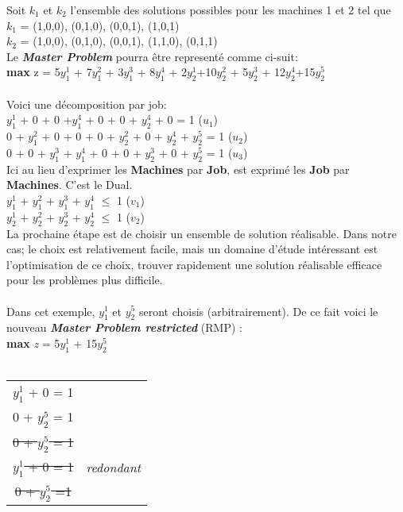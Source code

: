 \vspace{1cm}

Soit \textit{$k_1$} et \textit{$k_2$} l'ensemble des solutions possibles pour les machines 1 et 2 tel que
\\
\textit{$k_1$} = { (1,0,0), (0,1,0), (0,0,1), (1,0,1)} \\
\textit{$k_2$} = {  (1,0,0), (0,1,0), (0,0,1), (1,1,0), (0,1,1)} \\ 

Le \textbf{\textit{Master Problem}} pourra être representé comme ci-suit:
\\
\textbf{max} z = 5$y_1^1$ + 7$y_1^2$ + 3$y_1^3$ + 8$y_1^4$ + 2$y_2^1$+10$y_2^2$ + 5$y_2^3$ + 12$y_2^4$+15$y_2^5$
\\ \\
Voici une décomposition par job: \\
$y_1^1$ + 0 + 0 +$y_1^4$ + 0 + 0 + $y_2^4$ + 0 = 1 (\textit{$u_1$}) \\
0 + $y_1^2$ + 0 + 0 + 0 + $y_2^2$ + 0 + $y_2^4$ + $y_2^5$ = 1 (\textit{$u_2$}) \\
0 + 0 + $y_1^3$ + $y_1^4$ + 0 + 0 + $y_2^3$ + 0 + $y_2^5$ = 1     (\textit{$u_3$}) \\

Ici au lieu d'exprimer les \textbf{Machines} par \textbf{Job}, est exprimé les \textbf{Job} par \textbf{Machines}. C'est le Dual.\\
$y_1^1$ + $y_1^2$ + $y_1^3$ + $y_1^4$ $\leq$ 1 (\textit{$v_1$}) \\
$y_2^1$ + $y_2^2$ + $y_2^3$ + $y_2^4$ $\leq$ 1 (\textit{$v_2$}) \\

La prochaine étape est de choisir un ensemble de solution réalisable. Dans notre cas; le choix est relativement facile, mais un domaine d'étude intéressant est l'optimisation de ce choix, trouver rapidement une solution réalisable efficace pour les problèmes plus difficile.
\\
\\
Dans cet exemple, $y_1^1$ et $y_2^5$ seront choisis (arbitrairement). De ce fait voici le nouveau \textbf{\textit{Master Problem restricted}} (RMP) : \\
\textbf{max} \textit{z} = 5$y_1^1$  + 15$y_2^5$ 
\\ \\
\begin{tabular}{c c }
$y_1^1$  + 0 = 1 & \\
0 + $y_2^5$ = 1 & \\
\sout{0 + $y_2^5$ = 1} & \\
\sout{$y_1^1$  + 0 = 1} & \textit{redondant}\\
\sout{0 + $y_2^5$ =1} & \\ 
\end{tabular} 

